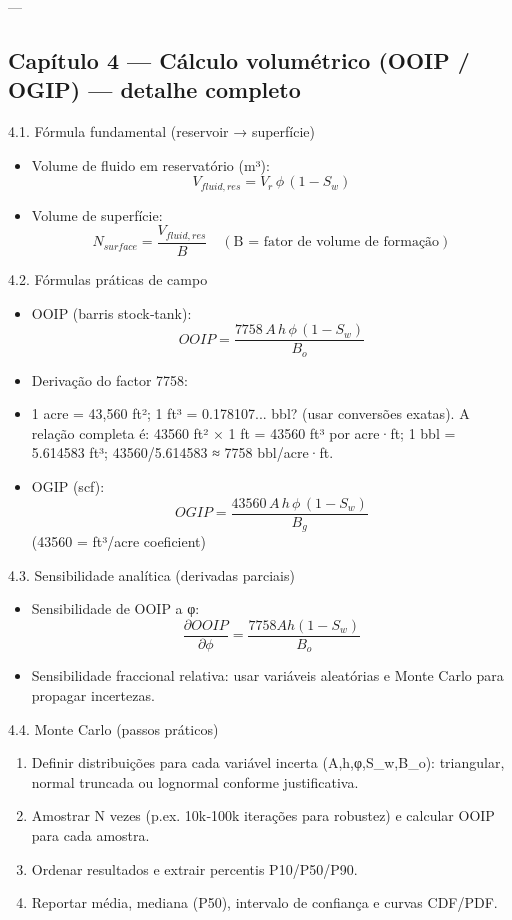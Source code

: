 \documentclass[11pt,a4paper]{article}
\begin{document}
---

\subsection{Capítulo 4 — Cálculo volumétrico (OOIP / OGIP) — detalhe completo}

4.1. Fórmula fundamental (reservoir → superfície)
\begin{itemize}
\item Volume de fluido em reservatório (m³):
$$V_{fluid,res}=V_r\,\phi\,(1-S_w)$$
\item Volume de superfície:
$$N_{surface}=\dfrac{V_{fluid,res}}{B}\quad(\text{B = fator de volume de formação})$$
\end{itemize}

4.2. Fórmulas práticas de campo
\begin{itemize}
\item OOIP (barris stock‑tank):
$$OOIP=\dfrac{7758\,A\,h\,\phi\,(1-S_w)}{B_o}$$
\item Derivação do factor 7758:
\item 1 acre = 43,560 ft²; 1 ft³ = 0.178107... bbl? (usar conversões exatas). A relação completa é: 43560 ft² × 1 ft = 43560 ft³ por acre·ft; 1 bbl = 5.614583 ft³; 43560/5.614583 ≈ 7758 bbl/acre·ft.
\end{itemize}

\begin{itemize}
\item OGIP (scf):
$$OGIP=\dfrac{43560\,A\,h\,\phi\,(1-S_w)}{B_g}$$
(43560 = ft³/acre coeficient)
\end{itemize}

4.3. Sensibilidade analítica (derivadas parciais)
\begin{itemize}
\item Sensibilidade de OOIP a φ:
$$\dfrac{\partial OOIP}{\partial\phi}=\dfrac{7758 A h (1-S_w)}{B_o}$$
\item Sensibilidade fraccional relativa: usar variáveis aleatórias e Monte Carlo para propagar incertezas.
\end{itemize}

4.4. Monte Carlo (passos práticos)
\begin{enumerate}
\item Definir distribuições para cada variável incerta (A,h,φ,S_w,B_o): triangular, normal truncada ou lognormal conforme justificativa.
\item Amostrar N vezes (p.ex. 10k‑100k iterações para robustez) e calcular OOIP para cada amostra.
\item Ordenar resultados e extrair percentis P10/P50/P90.
\item Reportar média, mediana (P50), intervalo de confiança e curvas CDF/PDF.
\end{enumerate}
\end{document}
